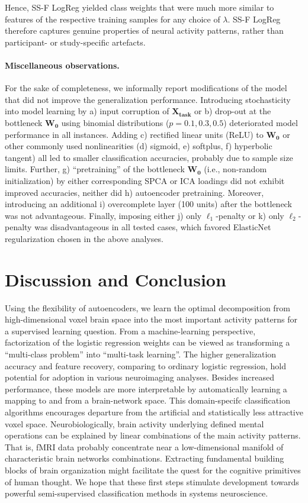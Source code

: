\documentclass{article} %
\begin{document}
%
Hence, SS-F LogReg yielded class weights 
that were much more similar to features of the respective training samples
for any choice of $\lambda$.
SS-F LogReg therefore
captures genuine properties of neural activity patterns,
rather than participant- or study-specific artefacts.

\paragraph{Miscellaneous observations.}
For the sake of completeness,
we informally report modifications of the model
that did not improve the generalization performance.
%
Introducing stochasticity into model learning by 
a) input corruption of $\mathbf{X_{task}}$ or
b) drop-out at the bottleneck $\mathbf{W_0}$ using binomial
distributions ($p=0.1, 0.3, 0.5$) deteriorated model performance
in all instances. 
%
Adding c) rectified linear units (ReLU) to $\mathbf{W_0}$ or
other commonly used nonlinearities (d) sigmoid, e) softplus,
f) hyperbolic tangent) all led to smaller classification accuracies,
probably due to sample size limits.
%
Further, g) ``pretraining'' of the bottleneck $\mathbf{W_0}$
(i.e., non-random initialization) by 
either corresponding SPCA or ICA loadings did not exhibit improved accuracies,
neither did h) autoencoder pretraining.
%
Moreover,
introducing an additional i) overcomplete layer (100 units)
after the bottleneck was not advantageous.
%
Finally, imposing either j) only $\ell_1$-penalty or 
k) only $\ell_2$-penalty was disadvantageous in all tested cases,
which favored ElasticNet regularization chosen in the above analyses.

\section{Discussion and Conclusion}
Using the flexibility of autoencoders, we
learn the optimal decomposition from high-dimensional
voxel brain space into the most important activity patterns for a
supervised learning question.
%
From a machine-learning perspective,
factorization of the logistic regression weights
can be viewed as transforming a ``multi-class problem'' into
``multi-task learning''.
%
The higher generalization accuracy and feature recovery, comparing to
ordinary logistic regression, hold potential
for adoption in various neuroimaging analyses.
Besides increased performance, these models are more interpretable by
automatically learning a mapping to and from a brain-network space.
%
This domain-specifc classification algorithms
encourages departure from the artificial and statistically
less attractive voxel space.
Neurobiologically,
brain activity underlying defined mental operations
can be explained by linear combinations of the main activity
patterns.
%
That is,
fMRI data probably concentrate near
a low-dimensional manifold of
characteristic brain networks combinations.
Extracting fundamental building blocks of brain organization might
facilitate the quest for the cognitive primitives of
human thought.
%
We hope that these first steps stimulate development towards
powerful semi-supervised classification methods in systems neuroscience.
\end{document}
